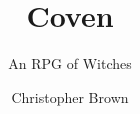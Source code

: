 \documentclass[a4paper,10pt,twocolumn]{memoir}
\title{Coven}
\subtitle{An RPG of Witches}
\author{Christopher Brown}
\begin{document}
\frontmatter

\titlepage



\tableofcontents

\mainmatter



\backmatter

\printindex
\end{document}
